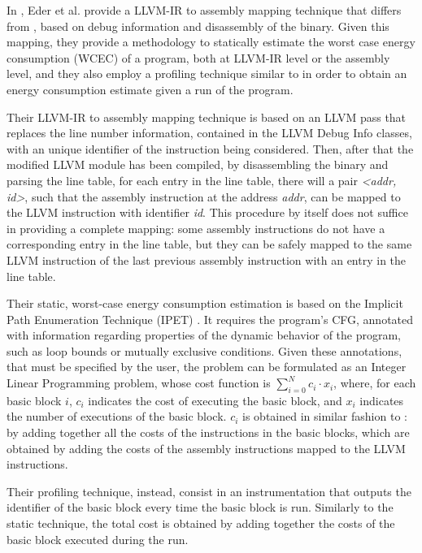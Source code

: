 In \cite{eder}, Eder et al. provide a LLVM-IR to assembly mapping technique that differs from \cite{brando2011}, based on debug information and disassembly of the binary. Given this mapping, they provide a methodology to statically estimate the worst case energy consumption (WCEC) of a program, both at LLVM-IR level or the assembly level, and they also employ a profiling technique similar to \cite{brando2011} in order to obtain an energy consumption estimate given a run of the program. \par 
Their LLVM-IR to assembly mapping technique is based on an LLVM pass that replaces the line number information, contained in the LLVM Debug Info classes, with an unique identifier of the instruction being considered. Then, after that the modified LLVM module has been compiled, by disassembling the binary and parsing the line table, for each entry in the line table, there will a pair \emph{<addr, id>}, such that the assembly instruction at the address \emph{addr}, can be mapped to the LLVM instruction with identifier \emph{id}.
\newline This procedure by itself does not suffice in providing a complete mapping: some assembly instructions do not have a corresponding entry in the line table, but they can be safely mapped to the same LLVM instruction of the last previous assembly instruction with an entry in the line table. \par 
Their static, worst-case energy consumption estimation is based on the Implicit Path Enumeration Technique (IPET) \cite{ipet}. It requires the program's CFG, annotated with information regarding properties of the dynamic behavior of the program, such as loop bounds or mutually exclusive conditions.
Given these annotations, that must be specified by the user, the problem can be formulated as an Integer Linear Programming problem, whose cost function is $\sum_{i=0}^{N} c_{i} \cdot x_{i}$, where, for each basic block $i$, $c_{i}$ indicates the cost of executing the basic block, and $x_{i}$ indicates the number of executions of the basic block. $c_{i}$ is obtained in similar fashion to \cite{brando2011}: by adding together all the costs of the instructions in the basic blocks, which are obtained by adding the costs of the assembly instructions mapped to the LLVM instructions. \par 
Their profiling technique, instead, consist in an instrumentation that outputs the identifier of the basic block every time the basic block is run. Similarly to the static technique, the total cost is obtained by adding together the costs of the basic block executed during the run.



